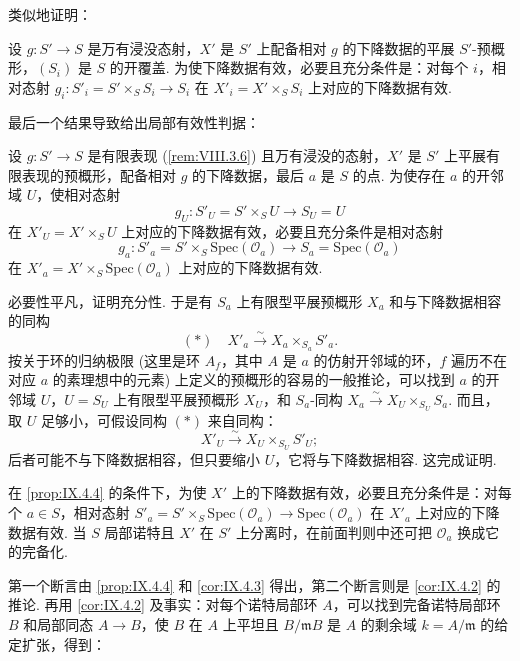 类似地证明：

\begin{corollary}\label{cor:IX.4.3}
设 $g \colon S' \to S$ 是万有浸没态射，$X'$ 是 $S'$ 上配备相对 $g$ 的下降数据的平展 $S'$-预概形，$(S_i)$ 是 $S$ 的开覆盖. 为使下降数据有效，必要且充分条件是：对每个 $i$，相对态射 $g_i \colon S'_i = S' \times_S S_i \to S_i$ 在 $X'_i = X' \times_S S_i$ 上对应的下降数据有效.
\end{corollary}

最后一个结果导致给出局部有效性判据：

\begin{proposition}\label{prop:IX.4.4}
设 $g \colon S' \to S$ 是有限表现 (\cref{rem:VIII.3.6}) 且万有浸没的态射，$X'$ 是 $S'$ 上平展有限表现的预概形，配备相对 $g$ 的下降数据，最后 $a$ 是 $S$ 的点. 为使存在 $a$ 的开邻域 $U$，使相对态射
\[
g_U \colon S'_U = S' \times_S U \longrightarrow S_U = U
\]
在 $X'_U = X' \times_S U$ 上对应的下降数据有效，必要且充分条件是相对态射
\[
g_a \colon S'_a = S' \times_S \mathrm{Spec}(\mathcal{O}_a) \longrightarrow S_a = \mathrm{Spec}(\mathcal{O}_a)
\]
在 $X'_a = X' \times_S \mathrm{Spec}(\mathcal{O}_a)$ 上对应的下降数据有效.
\end{proposition}

必要性平凡，证明充分性. 于是有 $S_a$ 上有限型平展预概形 $X_a$ 和与下降数据相容的同构
\[
(\ast) \quad X'_a \xrightarrow{\sim} X_a \times_{S_a} S'_a.
\]
按关于环的归纳极限 (这里是环 $A_f$，其中 $A$ 是 $a$ 的仿射开邻域的环，$f$ 遍历不在对应 $a$ 的素理想中的元素) 上定义的预概形的容易的一般推论，可以找到 $a$ 的开邻域 $U$，$U = S_U$ 上有限型平展预概形 $X_U$，和 $S_a$-同构 $X_a \xrightarrow{\sim} X_U \times_{S_U} S_a$. 而且，取 $U$ 足够小，可假设同构 $(\ast)$ 来自同构：
\[
X'_U \xrightarrow{\sim} X_U \times_{S_U} S'_U;
\]
后者可能不与下降数据相容，但只要缩小 $U$，它将与下降数据相容. 这完成证明.

\begin{corollary}\label{cor:IX.4.5}
在 \ref{prop:IX.4.4} 的条件下，为使 $X'$ 上的下降数据有效，必要且充分条件是：对每个 $a \in S$，相对态射 $S'_a = S' \times_S \mathrm{Spec}(\mathcal{O}_a) \to \mathrm{Spec}(\mathcal{O}_a)$ 在 $X'_a$ 上对应的下降数据有效. 当 $S$ 局部诺特且 $X'$ 在 $S'$ 上分离时，在前面判则中还可把 $\mathcal{O}_a$ 换成它的完备化.
\end{corollary}

第一个断言由 \ref{prop:IX.4.4} 和 \ref{cor:IX.4.3} 得出，第二个断言则是 \ref{cor:IX.4.2} 的推论. 再用 \ref{cor:IX.4.2} 及事实：对每个诺特局部环 $A$，可以找到完备诺特局部环 $B$ 和局部同态 $A \to B$，使 $B$ 在 $A$ 上平坦且 $B/\mathfrak{m}B$ 是 $A$ 的剩余域 $k = A/\mathfrak{m}$ 的给定扩张，得到：


